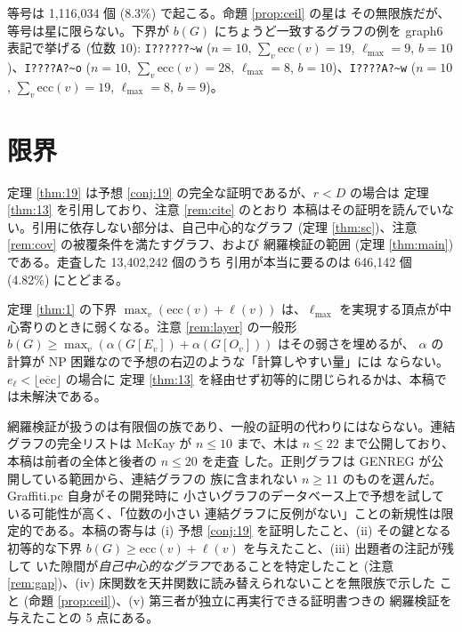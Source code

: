 \documentclass[paper=a4,fontsize=10.5pt,jafontsize=10.5pt]{jlreq}
\theoremstyle{plain}
\theoremstyle{definition}
\begin{document}
等号は 1,116,034 個 (8.3\%) で起こる。命題 \ref{prop:ceil} の星は
その無限族だが、等号は星に限らない。下界が $b(G)$ にちょうど一致するグラフの例を graph6 表記で挙げる (位数 $10$): \texttt{I??????\textasciitilde{}w} ($n = 10$, $\sum_v \mathrm{ecc}(v) = 19$, $\ell_{\max} = 9$, $b = 10$)、\texttt{I????A?\textasciitilde{}o} ($n = 10$, $\sum_v \mathrm{ecc}(v) = 28$, $\ell_{\max} = 8$, $b = 10$)、\texttt{I????A?\textasciitilde{}w} ($n = 10$, $\sum_v \mathrm{ecc}(v) = 19$, $\ell_{\max} = 8$, $b = 9$)。

\section{限界}

定理 \ref{thm:19} は予想 \ref{conj:19} の完全な証明であるが、$r < D$ の場合は
定理 \ref{thm:13} \cite{dw2004} を引用しており、注意 \ref{rem:cite} のとおり
本稿はその証明を読んでいない。引用に依存しない部分は、自己中心的なグラフ
(定理 \ref{thm:sc})、注意 \ref{rem:cov} の被覆条件を満たすグラフ、および
網羅検証の範囲 (定理 \ref{thm:main}) である。走査した 13,402,242 個のうち
引用が本当に要るのは 646,142 個 (4.82\%) にとどまる。

定理 \ref{thm:1} の下界 $\max_v(\mathrm{ecc}(v) + \ell(v))$ は、$\ell_{\max}$
を実現する頂点が中心寄りのときに弱くなる。注意 \ref{rem:layer} の一般形
$b(G) \ge \max_v (\alpha(G[E_v]) + \alpha(G[O_v]))$ はその弱さを埋めるが、
$\alpha$ の計算が NP 困難なので予想の右辺のような「計算しやすい量」には
ならない。$e_{\ell} < \lfloor \overline{\mathrm{ecc}} \rfloor$ の場合に
定理 \ref{thm:13} を経由せず初等的に閉じられるかは、本稿では未解決である。

網羅検証が扱うのは有限個の族であり、一般の証明の代わりにはならない。連結
グラフの完全リストは McKay \cite{mckay} が $n \le 10$ まで、木は
$n \le 22$ まで公開しており、本稿は前者の全体と後者の $n \le 20$ を走査
した。正則グラフは GENREG \cite{genreg} が公開している範囲から、連結グラフの
族に含まれない $n \ge 11$ のものを選んだ。Graffiti.pc 自身がその開発時に
小さいグラフのデータベース上で予想を試している可能性が高く、「位数の小さい
連結グラフに反例がない」ことの新規性は限定的である。本稿の寄与は
(i) 予想 \ref{conj:19} を証明したこと、(ii) その鍵となる初等的な下界
$b(G) \ge \mathrm{ecc}(v) + \ell(v)$ を与えたこと、(iii) 出題者の注記が残して
いた隙間が\emph{自己中心的なグラフ}であることを特定したこと (注意
\ref{rem:gap})、(iv) 床関数を天井関数に読み替えられないことを無限族で示した
こと (命題 \ref{prop:ceil})、(v) 第三者が独立に再実行できる証明書つきの
網羅検証を与えたことの 5 点にある。
\end{document}
